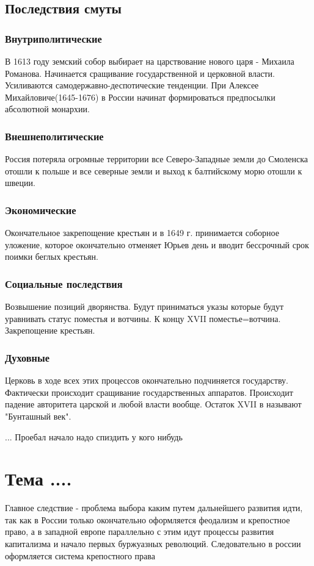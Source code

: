 \documentclass[a4paper]{article}
\begin{document}
\subsection{Последствия смуты}

\subsubsection{Внутриполитические}

В 1613 году земский собор выбирает на царствование нового царя - Михаила Романова. Начинается сращивание государственной и церковной власти. Усиливаются самодержавно-деспотические тенденции. При Алексее Михайловиче(1645-1676) в России начинат формироваться предпосылки абсолютной монархии.

\subsubsection{Внешнеполитические}
 Россия потеряла огромные территории все Северо-Западные земли до Смоленска отошли к польше и все северные земли и выход к балтийскому морю отошли к швеции.

 \subsubsection{Экономические}
 Окончательное закрепощение крестьян и в 1649 г. принимается соборное уложение, которое окончательно отменяет Юрьев день и вводит бессрочный срок поимки беглых крестьян.

 \subsubsection{Социальные последствия}
 Возвышение позиций дворянства. Будут приниматься указы которые будут уравнивать статус поместья и вотчины. К концу XVII поместье=вотчина.
 Закрепощение крестьян.

 \subsubsection{Духовные}
 Церковь в ходе всех этих процессов окончательно подчиняется государству. Фактически происходит сращивание государственных аппаратов.
 Происходит падение авторитета царской и любой власти вообще. Остаток XVII в называют "Бунташный век".

... Проебал начало надо спиздить у кого нибудь

\section{Тема ....}
Главное следствие - проблема выбора каким путем дальнейшего развития идти, так как в России только окончательно оформляется феодализм и крепостное право, а в западной европе параллельно с этим идут процессы развития капитализма и начало первых буржуазных революций.
Следовательно в россии оформляется система крепостного права
\end{document}

